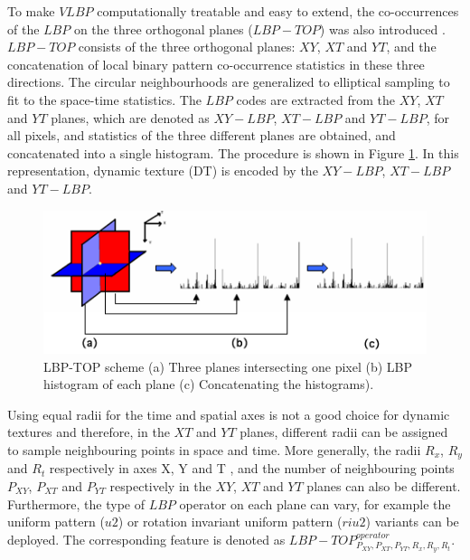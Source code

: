 

To make $VLBP$ computationally treatable and easy to extend, the co-occurrences of the $LBP$ on the three orthogonal planes ($LBP-TOP$) was also introduced \cite{zhao2007dynamic}. $LBP-TOP$ consists of the three orthogonal planes: $XY$, $XT$ and $YT$, and the concatenation of local binary pattern co-occurrence statistics in these three directions. The circular neighbourhoods are generalized to elliptical sampling to fit to the space-time statistics. The $LBP$ codes are extracted from the $XY$, $XT$ and $YT$ planes, which are denoted as $XY-LBP$, $XT-LBP$ and $YT-LBP$, for all pixels, and statistics of the three different planes are obtained, and concatenated into a single histogram. The procedure is shown in Figure \ref{fig:LBP-TOP_design}. In this representation, dynamic texture (DT) is encoded by the  $XY-LBP$, $XT-LBP$ and $YT-LBP$.

\begin{figure}[!htb]
\begin{center}
\includegraphics [width=0.75\linewidth] {images/proposed_countermeasure/LBP-TOP_design.png}
\caption[LBP-TOP scheme]{LBP-TOP scheme (a) Three planes intersecting one pixel (b) LBP histogram of each plane (c) Concatenating the histograms).} \label{fig:LBP-TOP_design}
\end{center}
\end{figure}

Using equal radii for the time and spatial axes is not a good choice for dynamic textures \citep{zhao2007dynamic} and therefore, in the $XT$ and $YT$ planes, different radii can be assigned to sample neighbouring points in space and time. More generally, the radii $R_{x}$, $R_{y}$  and $R_{t}$ respectively in axes X, Y and T , and the number of neighbouring points $P_{XY}$, $P_{XT}$ and $P_{YT}$ respectively in the $XY$, $XT$ and $YT$ planes can also be different. Furthermore, the type of $LBP$ operator on each plane can vary, for example the uniform pattern ($u2$) or rotation invariant uniform pattern ($riu2$) variants \citep{inen2011computer} can be deployed. The corresponding feature is denoted as $LBP-TOP_{P_{XY},P_{XT},P_{YT},R_{x},R_{y},R_{t}}^{operator}$.

